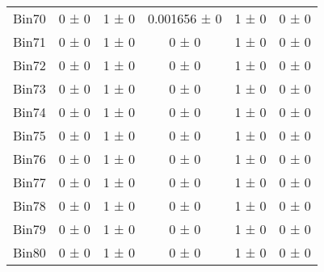 \begin{tabular}{@{\extracolsep{4pt}}lccccc@{}}
     Bin70 & 0 ± 0 & 1 ± 0 & 0.001656 ± 0 & 1 ± 0 & 0 ± 0 \\ 
     Bin71 & 0 ± 0 & 1 ± 0 & 0 ± 0 & 1 ± 0 & 0 ± 0 \\ 
     Bin72 & 0 ± 0 & 1 ± 0 & 0 ± 0 & 1 ± 0 & 0 ± 0 \\ 
     Bin73 & 0 ± 0 & 1 ± 0 & 0 ± 0 & 1 ± 0 & 0 ± 0 \\ 
     Bin74 & 0 ± 0 & 1 ± 0 & 0 ± 0 & 1 ± 0 & 0 ± 0 \\ 
     Bin75 & 0 ± 0 & 1 ± 0 & 0 ± 0 & 1 ± 0 & 0 ± 0 \\ 
     Bin76 & 0 ± 0 & 1 ± 0 & 0 ± 0 & 1 ± 0 & 0 ± 0 \\ 
     Bin77 & 0 ± 0 & 1 ± 0 & 0 ± 0 & 1 ± 0 & 0 ± 0 \\ 
     Bin78 & 0 ± 0 & 1 ± 0 & 0 ± 0 & 1 ± 0 & 0 ± 0 \\ 
     Bin79 & 0 ± 0 & 1 ± 0 & 0 ± 0 & 1 ± 0 & 0 ± 0 \\ 
     Bin80 & 0 ± 0 & 1 ± 0 & 0 ± 0 & 1 ± 0 & 0 ± 0 \\ 
\hline\hline
  \end{tabular}
